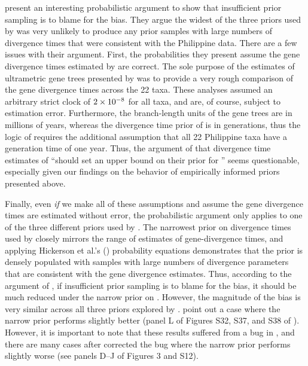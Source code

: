 \documentclass[letterpaper,12pt]{article}
\begin{document}
\begin{linenumbers}
\citet{Hickerson2013} present an interesting probabilistic argument
 to show that insufficient prior sampling is to blame for the bias.
They argue the widest of the three priors used by \citet{Oaks2012} was very
unlikely to produce any prior samples with large numbers of divergence times
that were consistent with the Philippine data.
There are a few issues with their argument.
First, the probabilities they present assume the gene divergence times
estimated by \citet{Oaks2012} are correct.
The sole purpose of the estimates of ultrametric gene trees presented by
\citet{Oaks2012} was to provide a very rough comparison of the gene divergence
times across the 22 taxa.  These analyses assumed an arbitrary strict clock of
$2\times 10^{-8}$ for all taxa, and are, of course, subject to estimation error.
Furthermore, the branch-length units of the gene trees are in millions of
years, whereas the divergence time prior of \msb is in generations, thus the
logic of \citet{Hickerson2013} requires the additional assumption that all 22
Philippine taxa have a generation time of one year.
Thus, the argument of \citet{Hickerson2013} that divergence time estimates of
\citet{Oaks2012} ``should set an upper bound on their prior for \divt{}'' seems
questionable, especially given our findings on the behavior of empirically
informed priors presented above.

Finally, even \emph{if} we make all of these assumptions and assume the gene
divergence times are estimated without error, the probabilistic argument only
applies to one of the three different priors used by \citet{Oaks2012}.
The narrowest prior on divergence times used by \citet{Oaks2012} closely mirrors
the range of estimates of gene-divergence times, and applying Hickerson et al.'s
(\citeyear{Hickerson2013}) probability equations demonstrates that the prior
is densely populated with samples with large numbers of divergence parameters
that are consistent with the gene divergence estimates.
Thus, according to the argument of \citet{Hickerson2013}, if insufficient prior
sampling is to blame for the bias, it should be much reduced under the narrow
prior on \divt{}.
However, the magnitude of the bias is very similar across all three priors
explored by \citet{Oaks2012}.
\citet{Hickerson2013} point out a case where the narrow prior performs
slightly better (panel L of Figures S32, S37, and S38 of \citet{Oaks2012}).
However, it is important to note that these results suffered from a bug
in \msb, and there are many cases after \citet{Oaks2012} corrected the 
bug where the narrow prior performs slightly worse (see panels D--J of
Figures 3 and S12).


\end{linenumbers}
\end{document}
